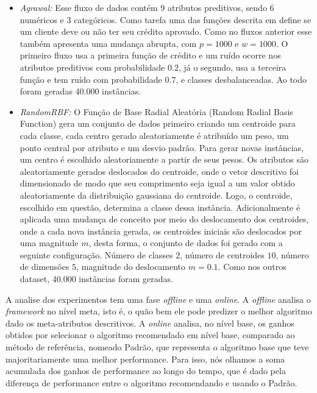 \begin{itemize}
\item{\textit{Agrawal:}} Esse fluxo de dados contém 9 atributos preditivos, sendo 6 numéricos e
3 categóricos. Como tarefa uma das funções descrita em \cite{agrawal1993database} define se
um cliente deve ou não ter seu crédito aprovado. Como no fluxos anterior esse também apresenta
uma mudança abrupta, com $p=1000$ e $w=1000$. O primeiro fluxo usa a primeira função de crédito
e um ruído ocorre nos atributos preditivos com probabilidade $0.2$, já o segundo, usa a terceira
função e tem ruído com probabilidade $0.7$, e classes desbalanceadas. Ao todo foram geradas
40.000 instâncias.

\item{\textit{RandomRBF:}} O Função de Base Radial Aleatória (Random Radial Basis Function)
gera um conjunto de dados primeiro criando um centroide para cada classe, cada centro gerado
aleatoriamente é atribuído um peso, um ponto central por atributo e um desvio padrão. Para
gerar novas instâncias, um centro é escolhido aleatoriamente a partir de seus pesos. Os
atributos são aleatoriamente gerados deslocados do centroide, onde o vetor descritivo foi
dimensionado de modo que seu comprimento seja igual a um valor obtido aleatoriamente da
distribuição gaussiana do centroide. Logo, o centroide, escolhido em questão, determina a
classe dessa instância. Adicionalmente é aplicada uma mudança de conceito por meio do
deslocamento dos centroides, onde a cada nova instância gerada, os centroides iniciais
são deslocados por uma magnitude $m$, desta forma, o conjunto de dados foi gerado com a
seguinte configuração. Número de classes $2$, número de centroides $10$, número de dimensões
$5$, magnitude do deslocamento $m=0.1$. Como nos outros dataset, 40.000 instâncias foram
geradas.
\end{itemize}

A analise dos experimentos tem uma fase \textit{offline} e uma \textit{online}. A \textit{offline} analisa o 
\textit{framework} no nível meta, isto é, o quão bem ele pode predizer o melhor algoritmo
dado os meta-atributos descritivos. A \textit{online} analisa, no nível base, os ganhos obtidos por
selecionar o algoritmo recomendado em nível base, comparado ao método de referência, nomeado
Padrão, que representa o algoritmo base que teve majoritariamente uma melhor performance.
Para isso, nós olhamos a soma acumulada dos ganhos de performance ao longo do tempo, que é dado
pela diferença de performance entre o algoritmo recomendando e usando o Padrão.